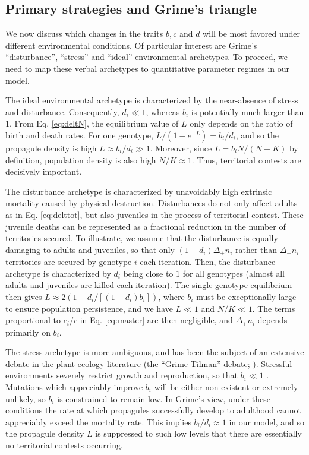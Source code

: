 \documentclass[11pt]{article}
\begin{document}
\subsection*{Primary strategies and Grime's triangle}

We now discuss which changes in the traits $b, c$ and $d$ will be most favored under different environmental conditions. Of particular interest are Grime's ``disturbance'', ``stress'' and ``ideal'' environmental archetypes. To proceed, we need to map these verbal archetypes to quantitative parameter regimes in our model. 

The ideal environmental archetype is characterized by the near-absence of stress and disturbance. Consequently, $d_i\ll 1$, whereas $b_i$ is potentially much larger than $1$. From Eq. \eqref{eq:deltN}, the equilibrium value of $L$ only depends on the ratio of birth and death rates. For one genotype, $L/(1-e^{-L})=b_i/d_i$, and so the propagule density is high $L\approx b_i/d_i\gg 1$. Moreover, since $L=b_i N/(N-K)$ by definition, population density is also high $N/K\approx 1$. Thus, territorial contests are decisively important.

The disturbance archetype is characterized by unavoidably high extrinsic mortality caused by physical destruction. Disturbances do not only affect adults as in Eq. \eqref{eq:delttot}, but also juveniles in the process of territorial contest. These juvenile deaths can be represented as a fractional reduction in the number of territories secured. To illustrate, we assume that the disturbance is equally damaging to adults and juveniles, so that only $(1-d_i)\Delta_+ n_i$ rather than $\Delta_+ n_i$ territories are secured by genotype $i$ each iteration. Then, the disturbance archetype is characterized by $d_i$ being close to $1$ for all genotypes (almost all adults and juveniles are killed each iteration). The single genotype equilibrium then gives $L\approx 2(1-d_i/[(1-d_i)b_i])$, where $b_i$ must be exceptionally large to ensure population persistence, and we have $L\ll 1$ and $N/K\ll 1$. The terms proportional to $c_i/\overline{c}$ in Eq. \eqref{eq:master} are then negligible, and $\Delta_+ n_i$ depends primarily on $b_i$. 

The stress archetype is more ambiguous, and has been the subject of an extensive debate in the plant ecology literature (the ``Grime-Tilman'' debate; \citealt{aerts_1999}). Stressful environments severely restrict growth and reproduction, so that $b_i\ll 1$ \cite{grime_1974,grime_1977}. Mutations which appreciably improve $b_i$ will be either non-existent or extremely unlikely, so $b_i$ is constrained to remain low. In Grime's view, under these conditions the rate at which propagules successfully develop to adulthood cannot appreciably exceed the mortality rate. This implies $b_i/d_i\approx 1$ in our model, and so the propagule density $L$ is suppressed to such low levels that there are essentially no territorial contests occurring. 
\end{document}
